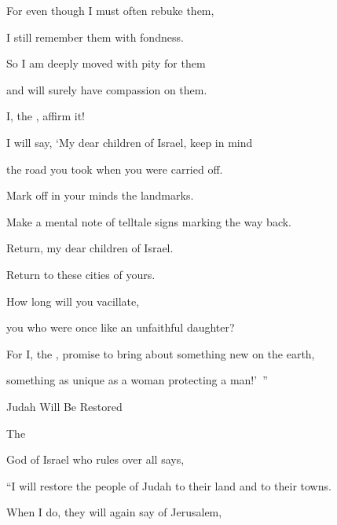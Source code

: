 {\par }{\Q For
even though
I must often rebuke
them,
\par }{\Q I still
remember
them
with fondness.
\par }{\Q So
I am deeply
moved
with pity
for them

\par }{\Q and will surely have compassion
on them.
\par }{\Q I, the
{}, affirm it!
\par }{\Q {}I will say, ‘My dear children of Israel,
keep in mind
\par }{\Q the road
you took
when you were carried off.

\par }{\Q Mark off
in your minds
the landmarks.
\par }{\Q Make
a mental note of telltale signs marking the way
back.
\par }{\Q Return,
my dear children
of Israel.
\par }{\Q Return
to
these cities
of yours.
\par }{\Q {}How long
will you vacillate,
\par }{\Q you who were once like an unfaithful daughter?

\par }{\Q For
I,
the {}, promise
to bring
about something new
on the earth,
\par }{\Q something as unique as a woman
protecting
a man!’ ”
\par }{\SH Judah Will Be Restored
\par }{\PP {}The

{}
God
of Israel
who rules over all
says,
\par }{\Q “I will restore
the people of Judah
to their land
and to their towns.
\par }{\Q When
I do,
they will again
say
of Jerusalem,

}
